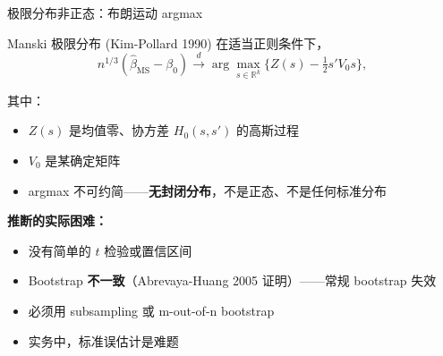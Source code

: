 \documentclass[aspectratio=169, 10pt]{beamer}
\begin{document}
\begin{frame}{极限分布非正态：布朗运动 argmax}

  \begin{definitionbox}{{Manski 极限分布 (Kim-Pollard 1990)}}
    在适当正则条件下，
    $$n^{1/3}(\hat\beta_{\text{MS}} - \beta_0) \overset{d}{\to} \arg\max_{s \in \mathbb{R}^k}
    \bigl\{Z(s) - \tfrac{1}{2} s' V_0 s\bigr\},$$

    其中：
    \begin{itemize}\setlength{\itemsep}{1pt}
      \item $Z(s)$ 是均值零、协方差 $H_0(s, s')$ 的高斯过程
      \item $V_0$ 是某确定矩阵
      \item argmax 不可约简——\textbf{无封闭分布}，不是正态、不是任何标准分布
    \end{itemize}
  \end{definitionbox}

  \begin{highlightbox}
    \textbf{推断的实际困难：}
    \begin{itemize}\setlength{\itemsep}{1pt}
      \item 没有简单的 $t$ 检验或置信区间
      \item Bootstrap \textbf{不一致}（Abrevaya-Huang 2005 证明）——常规 bootstrap 失效
      \item 必须用 subsampling 或 m-out-of-n bootstrap
      \item 实务中，标准误估计是难题
    \end{itemize}
  \end{highlightbox}

  \hypertarget{main-c14}{}
  \hfill{\scriptsize\hyperlink{proof-c14}{}}

\end{frame}
\end{document}
